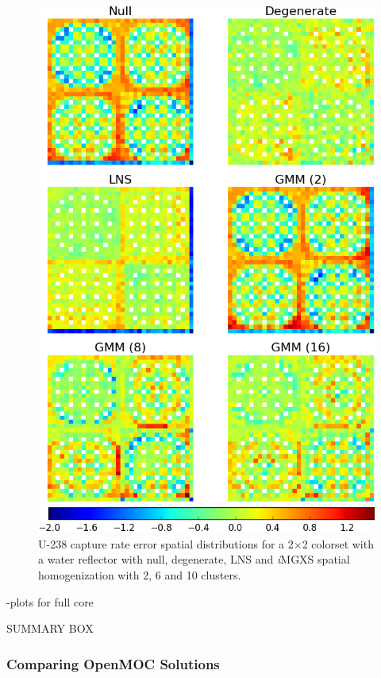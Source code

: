 \begin{figure}[h!]
\centering
\includegraphics[width=0.9\linewidth]{figures/results/spatial/reflector/capt-err}
\vspace{2mm}
\caption[U-238 capture rate errors for a 2$\times$2 colorset with reflector]{U-238 capture rate error spatial distributions for a 2$\times$2 colorset with a water reflector with null, degenerate, \ac{LNS} and \textit{i}\ac{MGXS} spatial homogenization with 2, 6 and 10 clusters.}
\label{fig:chap11-refl-capt-rates}
\end{figure}

\clearpage

-plots for full core

SUMMARY BOX

\subsubsection{Comparing OpenMOC Solutions}
\label{subsec:chap11-imgxs-capt-rates-compare}

